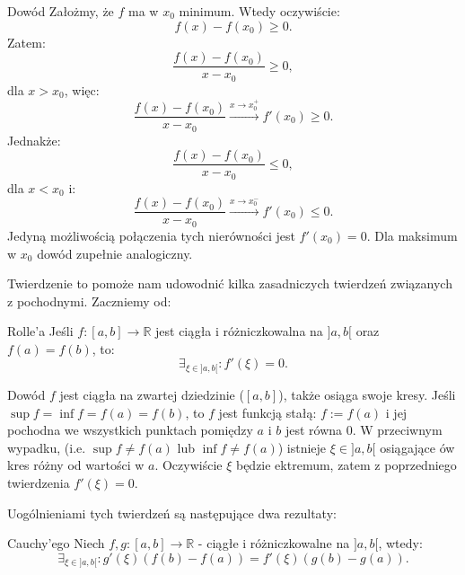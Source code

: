 \documentclass{article}
\numberwithin{defi}{section}
\numberwithin{defi}{section}
\newcommand{\R}{\mathbb{R}}
\renewcommand{\geq}{\geqslant}
\renewcommand{\leq}{\leqslant}
\begin{document}
    \begin{dow}{Dowód}
        Założmy, że $f$ ma w $x_0$ minimum. Wtedy oczywiście: \begin{equation*}
            f(x) - f(x_0) \geq 0. 
        \end{equation*} Zatem: \begin{equation*}
            \frac{f(x) - f(x_0)}{x - x_0} \geq 0,
        \end{equation*} dla $x > x_0$, więc: \begin{equation*}
            \frac{f(x) - f(x_0)}{x - x_0} \xrightarrow{x \to x_0^+} f'(x_0) \geq 0.
        \end{equation*} Jednakże: \begin{equation*}
            \frac{f(x) - f(x_0)}{x - x_0} \leq 0,
        \end{equation*} dla $x < x_0$ i:\begin{equation*}
            \frac{f(x) - f(x_0)}{x - x_0} \xrightarrow{x \to x_0^-} f'(x_0) \leq 0.
        \end{equation*} Jedyną możliwością połączenia tych nierówności jest $f'(x_0) = 0$. Dla maksimum w $x_0$ dowód zupełnie analogiczny.
    \end{dow}


    Twierdzenie to pomoże nam udowodnić kilka zasadniczych twierdzeń związanych z pochodnymi. Zaczniemy od:
    \begin{twier}{Rolle'a}
        Jeśli $f: [a, b] \to \R$ jest ciągła i różniczkowalna na $]a, b[$ oraz $f(a) = f(b)$, to: \begin{equation*}
            \exists_{\xi \in ]a, b[ }: f'(\xi) = 0. 
        \end{equation*}
    \end{twier}

    \begin{dow}{Dowód}
        $f$ jest ciągła na zwartej dziedzinie ($[a, b]$), także osiąga swoje kresy. Jeśli $\sup f = \inf f = f(a) = f(b)$, to $f$ jest funkcją stałą: $f := f(a)$ i jej pochodna we wszystkich punktach pomiędzy $a$ i $b$ jest równa 0. W przeciwnym wypadku, (i.e. $\sup f \neq f(a)$ lub $\inf f \neq f(a)$) istnieje $\xi \in ]a, b[$ osiągające ów kres różny od wartości w $a$. Oczywiście $\xi$ będzie ektremum, zatem z poprzedniego twierdzenia $f'(\xi) = 0$. 
    \end{dow}

    Uogólnieniami tych twierdzeń są następujące dwa rezultaty:

    \begin{twier}{Cauchy'ego}
        Niech $f, g: [a, b] \to \R$ - ciągłe i różniczkowalne na $]a, b[$, wtedy:\begin{equation}
            \exists_{\xi \in ]a, b[ }: g'(\xi) (f(b) - f(a)) = f'(\xi) (g(b) - g(a)).
        \end{equation} 
    \end{twier}
\end{document}
